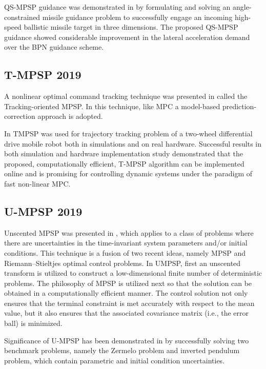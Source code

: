 \documentclass[12pt]{article}
\begin{document}
QS-MPSP guidance was demonstrated in \cite{mondal2018angle} by formulating and solving an angle-constrained missile guidance problem to successfully engage an incoming high-speed ballistic missile target in three dimensions. The proposed QS-MPSP guidance showed considerable improvement in the lateral acceleration demand over the BPN guidance scheme.

\subsection{T-MPSP 2019}
A nonlinear optimal command tracking technique was presented in \cite{kumar2019model} called the Tracking-oriented MPSP. In this technique, like MPC a model-based prediction-correction approach is adopted.

In \cite{kumar2019model} TMPSP was used for trajectory tracking problem of a two-wheel differential drive mobile robot both in simulations and on real hardware. Successful results in both simulation and hardware implementation study demonstrated that the proposed, computationally efficient, T-MPSP algorithm can be implemented online and is promising for controlling dynamic systems under the paradigm of fast non-linear MPC.



  
\subsection{U-MPSP 2019}
Unscented MPSP was presented in \cite{mathavaraj2019unscented}, which applies to a class of problems where there are uncertainties in the time-invariant system parameters and/or initial conditions. This technique is a fusion of two recent ideas, namely MPSP and Riemann–Stieltjes optimal control problems. In UMPSP, first an unscented transform is utilized to construct a low-dimensional finite number of deterministic problems. The philosophy of MPSP is utilized next so that the solution can be obtained in a computationally efficient manner. The control solution not only ensures that the terminal constraint is met accurately with respect to the mean value, but it also ensures that the associated covariance matrix (i.e., the error ball) is minimized.

Significance of U-MPSP has been demonstrated in \cite{mathavaraj2019unscented} by successfully solving two benchmark problems, namely the Zermelo problem and inverted pendulum problem, which contain parametric and initial condition uncertainties.
\end{document}
